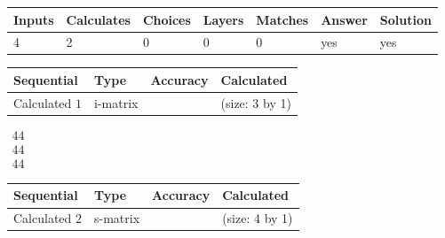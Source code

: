 \documentclass[12pt]{article}
\begin{document}
 
 
\noindent{}
 
 

 
 
 
\noindent{}
 
 

 
 
\noindent{}
 
 

 
\vspace{0.3in}
   
   
   
   
\noindent\begin{tabular}{|l|l|l|l|l|l|l|}
 \hline
Inputs & Calculates & Choices & Layers & Matches & Answer & Solution \\ \hline
           4 & 
           2 & 
           0
  & 
           0 & 
           0 & 
  yes & 
  yes 
  \\ \hline
 \end{tabular}
   
   
   
   
\noindent{}
   
   
  
  
\noindent\begin{tabular}{|l|l|l|l|}
\hline
 Sequential & Type & Accuracy & Calculated \\ 
\hline
 
 
  Calculated $           1$ & i-matrix &  & 
 (size:           3 by           1)
 \\  \hline  
 \end{tabular}
   
   
$\begin{array}{
 c
 }
          44 \\ 
          44 \\ 
          44
 \end{array}  $ 
  
  
\noindent\begin{tabular}{|l|l|l|l|}
\hline
 Sequential & Type & Accuracy & Calculated \\ 
\hline
 
 
  Calculated $           2$ & s-matrix & & 
 (size:           4 by           1)
 \\  \hline  
 \end{tabular}
   
\end{document}
